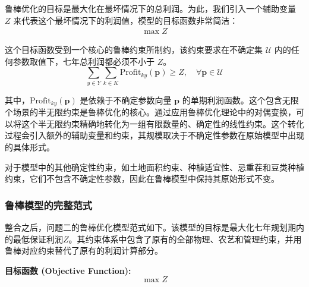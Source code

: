 \documentclass[withoutpreface,bwprint]{cumcmthesis} %
\begin{document}
鲁棒优化的目标是最大化在最坏情况下的总利润。为此，我们引入一个辅助变量 $Z$ 来代表这个最坏情况下的利润值，模型的目标函数非常简洁：
\begin{align}
	\max Z
\end{align}

这个目标函数受到一个核心的鲁棒约束所制约，该约束要求在不确定集 $\mathcal{U}$ 内的任何参数取值下，七年总利润都必须不小于 $Z$。
\begin{equation}
	\sum_{y \in Y} \sum_{k \in K} \text{Profit}_{ky}(\mathbf{p}) \ge Z, \quad \forall \mathbf{p} \in \mathcal{U}
\end{equation}

其中，$\text{Profit}_{ky}(\mathbf{p})$ 是依赖于不确定参数向量 $\mathbf{p}$ 的单期利润函数。这个包含无限个场景的半无限约束是鲁棒优化的核心。通过应用鲁棒优化理论中的对偶变换，可以将这个半无限约束精确地转化为一组有限数量的、确定性的线性约束。这个转化过程会引入额外的辅助变量和约束，其规模取决于不确定性参数在原始模型中出现的具体形式。

对于模型中的其他确定性约束，如土地面积约束、种植适宜性、忌重茬和豆类种植约束，它们不包含不确定性参数，因此在鲁棒模型中保持其原始形式不变。

\subsubsection{鲁棒模型的完整范式}

整合之后，问题二的鲁棒优化模型范式如下。该模型的目标是最大化七年规划期内的最低保证利润$Z$。其约束体系中包含了原有的全部物理、农艺和管理约束，并用鲁棒对应约束替代了原有的利润计算部分。

\textbf{目标函数 (Objective Function):}
\begin{equation}
	\max Z
\end{equation}
\end{document}
